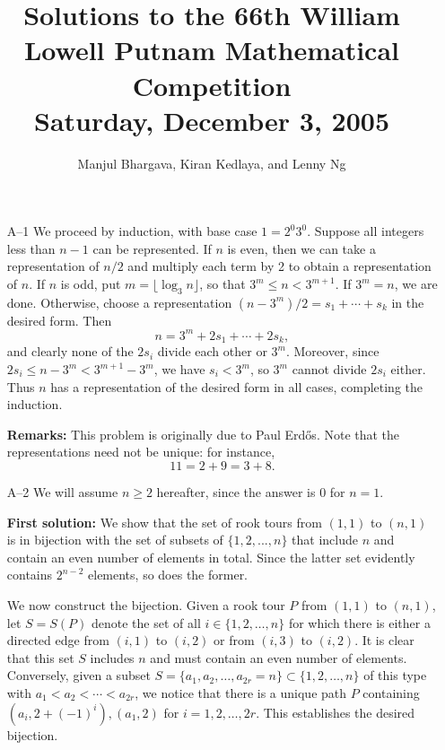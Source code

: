 \documentclass[amssymb,twocolumn,pra,10pt,aps]{revtex4-1}
\begin{document}
\title{Solutions to the 66th William Lowell Putnam Mathematical Competition \\
    Saturday, December 3, 2005}
\author{Manjul Bhargava, Kiran Kedlaya, and Lenny Ng}
\noaffiliation
\maketitle

\begin{itemize}

\item[A--1]
We proceed by induction, with base case $1 = 2^0 3^0$. Suppose all
integers less than $n-1$ can be represented. If $n$ is even, then
we can take a representation of $n/2$ and multiply each term by 2 to
obtain a representation of $n$. If $n$ is odd,
put $m = \lfloor \log_3 n
\rfloor$, so that $3^m \leq n < 3^{m+1}$. If $3^m = n$, we are done.
Otherwise, choose a representation $(n-3^m)/2 = s_1 + \cdots + s_k$
in the desired form. Then
\[
n = 3^m + 2s_1 + \cdots + 2s_k,
\]
and clearly none of the $2s_i$ divide each other or $3^m$. Moreover,
since $2s_i \leq n-3^m < 3^{m+1} - 3^m$, we have $s_i < 3^m$,
so $3^m$ cannot divide $2s_i$ either. Thus $n$ has a representation
of the desired form in all cases, completing the induction.

\textbf{Remarks:}
This problem is originally due to Paul Erd\H{o}s.
Note that the representations need not be unique: for instance,
\[
11 = 2+9 = 3+8.
\]

\item[A--2]
We will assume $n \geq 2$ hereafter, since the answer is 0 for $n=1$.

\textbf{First solution:}
We show that the set of rook tours from $(1,1)$ to $(n,1)$ is in bijection with
the set of subsets of $\{1,2,...,n\}$ that include $n$ and contain an even number
of elements in total.  Since the latter set evidently contains $2^{n-2}$ elements,
so does the former.

We now construct the bijection.  Given a rook tour $P$ from $(1,1)$ to $(n,1)$,
let $S=S(P)$ denote the set of all $i \in \{1,2,\ldots,n\}$ for which there is
either a directed edge from $(i,1)$ to $(i,2)$ or from $(i,3)$ to $(i,2)$.  It
is clear that this set $S$ includes $n$ and must contain an even number of
elements.  Conversely, given a subset $S=\{a_1,a_2,\ldots,a_{2r}=n\}
\subset \{1,2,\ldots,n\}$ of this type with $a_1<a_2<\cdots<a_{2r}$,
we notice that there is a unique path $P$ containing
$(a_i,2+(-1)^i),(a_1,2)$
for $i=1,2,\ldots,2r$.  This establishes the desired bijection.



\end{itemize}
\end{document}
